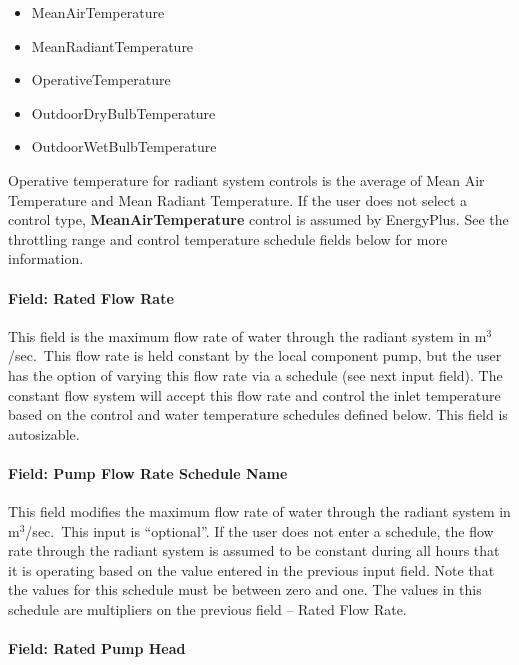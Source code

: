 \begin{itemize}
\item
  MeanAirTemperature
\item
  MeanRadiantTemperature
\item
  OperativeTemperature
\item
  OutdoorDryBulbTemperature
\item
  OutdoorWetBulbTemperature
\end{itemize}

Operative temperature for radiant system controls is the average of Mean Air Temperature and Mean Radiant Temperature. If the user does not select a control type, \textbf{MeanAirTemperature} control is assumed by EnergyPlus. See the throttling range and control temperature schedule fields below for more information.

\paragraph{Field: Rated Flow Rate}\label{field-rated-flow-rate}

This field is the maximum flow rate of water through the radiant system in m\(^{3}\)/sec.~This flow rate is held constant by the local component pump, but the user has the option of varying this flow rate via a schedule (see next input field). The constant flow system will accept this flow rate and control the inlet temperature based on the control and water temperature schedules defined below. This field is autosizable.

\paragraph{Field: Pump Flow Rate Schedule Name}\label{field-pump-flow-rate-schedule-name-001}

This field modifies the maximum flow rate of water through the radiant system in m\(^{3}\)/sec.~This input is ``optional''. If the user does not enter a schedule, the flow rate through the radiant system is assumed to be constant during all hours that it is operating based on the value entered in the previous input field. Note that the values for this schedule must be between zero and one. The values in this schedule are multipliers on the previous field -- Rated Flow Rate.

\paragraph{Field: Rated Pump Head}\label{field-rated-pump-head}

